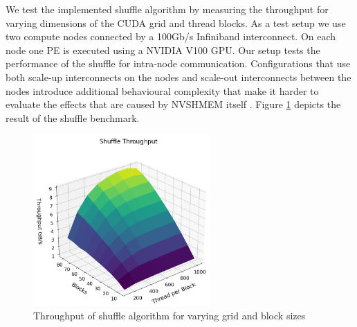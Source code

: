 We test the implemented shuffle algorithm by measuring the throughput for varying dimensions of the CUDA grid and thread blocks. As a test setup we use two compute nodes connected by a 100Gb/s Infiniband interconnect. On each node one PE is executed using a NVIDIA V100 GPU. Our setup tests the performance of the shuffle for intra-node communication. Configurations that use both scale-up interconnects on the nodes and scale-out interconnects between the nodes introduce additional behavioural complexity that make it harder to evaluate the effects that are caused by NVSHMEM itself \cite{li2020}. Figure \ref{fig:shuffle_throughput} depicts the result of the shuffle benchmark.

\begin{figure}[h]
    \centering
    \includegraphics[width=0.6\textwidth]{img/shuffle_throughput.png}
    \caption{Throughput of shuffle algorithm for varying grid and block sizes}
    \label{fig:shuffle_throughput}
\end{figure}


